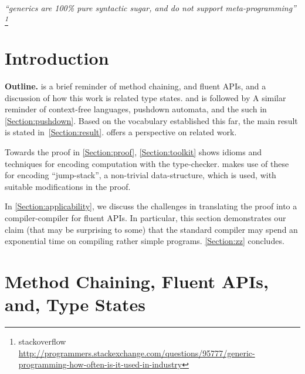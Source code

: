 \documentclass[a4paper,USenglish]{lipics}
\author{Anonymized for the submission}
\begin{document}
\maketitle
\hfill
  \parbox{40ex}{
    \begin{flushright}
    \scriptsize\itshape ``\protect \Java   generics are 100\protect\% pure syntactic sugar,
    and do not support meta-programming''%
    \footnote{
      stackoverflow
      \tiny
       \url{http://programmers.stackexchange.com/questions/95777/generic-programming-how-often-is-it-used-in-industry}
    }
    \end{flushright}
  }
\newline

\begin{abstract}
  
\end{abstract}

\section{Introduction}


\textbf{Outline.}
 is a brief reminder of method chaining, 
  and fluent APIs, and a discussion of how this work is related type states. 
  and is followed by 
A similar reminder of context-free languages, pushdown automata, 
  and the such in \cref{Section:pushdown}.
Based on the vocabulary established this far, 
  the main result is stated in~\cref{Section:result}.
 offers a perspective on related work.

Towards the proof in \cref{Section:proof}, \cref{Section:toolkit} 
  shows idioms and techniques for encoding computation with    
  the \Java type-checker.
 makes use of these for encoding 
  ``jump-stack'', a non-trivial data-structure,
  which is used, with suitable modifications in the proof. 

In \cref{Section:applicability}, we discuss the challenges in
  translating the proof into a compiler-compiler for fluent APIs.
In particular, this section demonstrates our claim (that may be
  surprising to some) that the standard \Java compiler may spend
  an exponential time on compiling rather simple programs.
\cref{Section:zz} concludes.

  
\section{Method Chaining, Fluent APIs, and, Type States}
\label{Section:fluent}

\end{document}
